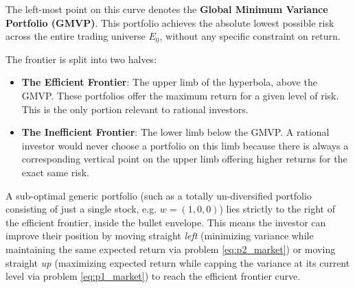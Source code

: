 The left-most point on this curve denotes the \textbf{Global Minimum Variance Portfolio (GMVP)}. This portfolio achieves the absolute lowest possible risk across the entire trading universe $E_0$, without any specific constraint on return.

The frontier is split into two halves:
\begin{itemize}
    \item \textbf{The Efficient Frontier}: The upper limb of the hyperbola, above the GMVP. These portfolios offer the maximum return for a given level of risk. This is the only portion relevant to rational investors.
    \item \textbf{The Inefficient Frontier}: The lower limb below the GMVP. A rational investor would never choose a portfolio on this limb because there is always a corresponding vertical point on the upper limb offering higher returns for the exact same risk.
\end{itemize}

A sub-optimal generic portfolio (such as a totally un-diversified portfolio consisting of just a single stock, e.g. $w = (1, 0, 0)$) lies strictly to the right of the efficient frontier, inside the bullet envelope. This means the investor can improve their position by moving straight \textit{left} (minimizing variance while maintaining the same expected return via problem \eqref{eq:p2_market}) or moving straight \textit{up} (maximizing expected return while capping the variance at its current level via problem \eqref{eq:p1_market}) to reach the efficient frontier curve.
